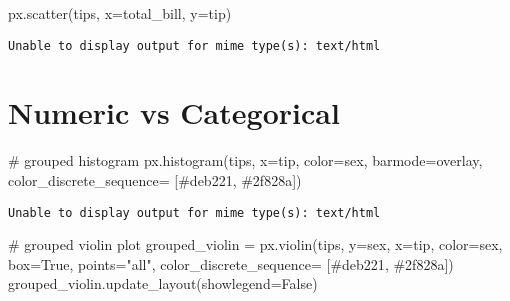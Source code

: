 \documentclass[
  letterpaper,
  DIV=11,
  numbers=noendperiod]{scrreprt}
\newenvironment{Shaded}{\begin{snugshade}}{\end{snugshade}}
\newcommand{\CommentTok}[1]{\textcolor[rgb]{0.37,0.37,0.37}{#1}}
\newcommand{\NormalTok}[1]{\textcolor[rgb]{0.00,0.23,0.31}{#1}}
\newcommand{\OperatorTok}[1]{\textcolor[rgb]{0.37,0.37,0.37}{#1}}
\newcommand{\StringTok}[1]{\textcolor[rgb]{0.13,0.47,0.30}{#1}}
\newcommand{\VariableTok}[1]{\textcolor[rgb]{0.07,0.07,0.07}{#1}}
\begin{document}
\begin{Shaded}
\begin{Highlighting}[]
\NormalTok{px.scatter(tips, x}\OperatorTok{=}\StringTok{\textquotesingle{}total\_bill\textquotesingle{}}\NormalTok{, y}\OperatorTok{=}\StringTok{\textquotesingle{}tip\textquotesingle{}}\NormalTok{)}
\end{Highlighting}
\end{Shaded}

\begin{verbatim}
Unable to display output for mime type(s): text/html
\end{verbatim}

\chapter{Numeric vs Categorical}\label{numeric-vs-categorical}

\begin{Shaded}
\begin{Highlighting}[]
\CommentTok{\# grouped histogram}
\NormalTok{px.histogram(tips, x}\OperatorTok{=}\StringTok{\textquotesingle{}tip\textquotesingle{}}\NormalTok{, color}\OperatorTok{=}\StringTok{\textquotesingle{}sex\textquotesingle{}}\NormalTok{, barmode}\OperatorTok{=}\StringTok{\textquotesingle{}overlay\textquotesingle{}}\NormalTok{, color\_discrete\_sequence}\OperatorTok{=}\NormalTok{ [}\StringTok{\textquotesingle{}\#deb221\textquotesingle{}}\NormalTok{, }\StringTok{\textquotesingle{}\#2f828a\textquotesingle{}}\NormalTok{])}
\end{Highlighting}
\end{Shaded}

\begin{verbatim}
Unable to display output for mime type(s): text/html
\end{verbatim}

\begin{Shaded}
\begin{Highlighting}[]
\CommentTok{\# grouped violin plot}
\NormalTok{grouped\_violin }\OperatorTok{=}\NormalTok{ px.violin(tips, y}\OperatorTok{=}\StringTok{\textquotesingle{}sex\textquotesingle{}}\NormalTok{, x}\OperatorTok{=}\StringTok{\textquotesingle{}tip\textquotesingle{}}\NormalTok{, color}\OperatorTok{=}\StringTok{\textquotesingle{}sex\textquotesingle{}}\NormalTok{, box}\OperatorTok{=}\VariableTok{True}\NormalTok{, points}\OperatorTok{=}\StringTok{"all"}\NormalTok{, color\_discrete\_sequence}\OperatorTok{=}\NormalTok{ [}\StringTok{\textquotesingle{}\#deb221\textquotesingle{}}\NormalTok{, }\StringTok{\textquotesingle{}\#2f828a\textquotesingle{}}\NormalTok{])}
\NormalTok{grouped\_violin.update\_layout(showlegend}\OperatorTok{=}\VariableTok{False}\NormalTok{)}
\end{Highlighting}
\end{Shaded}
\end{document}
